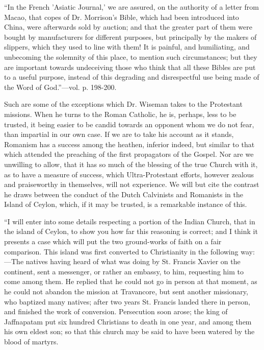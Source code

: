 ``In
the French 'Asiatic Journal,' we are assured, on the authority of a
letter from Macao, that copes of Dr. Morrison's Bible, which had been
introduced into China, were afterwards sold by auction; and that the
greater part of them were bought by manufacturers for different
purposes, but principally by the makers of slippers, which they used to
line with them! It is painful, and humiliating, and unbecoming the
solemnity of
this place, to mention such circumstances; but they are important
towards undeceiving those who think that all these Bibles are put to a
useful purpose, instead of this degrading and disrespectful use being
made of the Word of God.''—vol. p. 198-200.

Such are
some of the exceptions which Dr. Wiseman takes to the Protestant
missions. When he turns to the Roman Catholic, he is, perhaps, less to
be trusted, it being easier to be candid towards an opponent whom we do
not fear, than impartial in our own case. If we are to take his account
as it stands, Romanism has a success among the heathen, inferior indeed,
but similar to that which attended the preaching of the first
propagators of the Gospel. Nor are we unwilling to allow, that it has so
much of the blessing of the true Church with it, as to have a measure of
success, which Ultra-Protestant efforts, however zealous and
praiseworthy in themselves, will not experience. We will but cite the
contrast he draws between the conduct of the Dutch Calvinists and
Romanists in the Island of Ceylon, which, if it may be trusted, is a
remarkable instance of this.

``I
will enter into some details respecting a portion of the Indian Church,
that in the island of Ceylon, to show you how far this reasoning is
correct; and I think it presents a case which will put the two
ground-works of faith on a fair comparison. This island was first
converted to Christianity in the following way:—The natives having
heard of what was doing by St. Francis Xavier on the continent, sent a
messenger, or rather an embassy, to him, requesting him to come among
them. He replied that he could not go in person at that moment, as he
could not abandon the mission at Travancore, but sent another
missionary, who baptized many natives; after two years St. Francis
landed there in person, and finished the work of conversion. Persecution
soon arose; the king of Jaffnapatam put six hundred Christians to death
in one year, and among them his own eldest son; so that this church may
be said to have been watered by the blood of martyrs.

